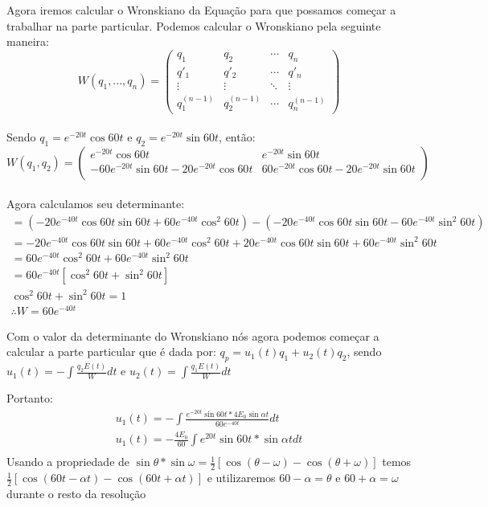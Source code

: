 \documentclass{abntex2}
\begin{document}
Agora iremos calcular o Wronskiano da Equação para que possamos começar a trabalhar na parte particular.
\vspace{0.5cm}
Podemos calcular o Wronskiano pela seguinte maneira:
$$ W(q_1, ..., q_n)=\left(\begin{array}{cccc}
q_{1} & q_{2} & \cdots & q_{n}\\
q'_{1} & q'_{2} & \cdots & q'_{n}\\
\vdots & \vdots & \ddots & \vdots\\
q^{(n-1)}_{1} & q^{(n-1)}_{2} & \cdots & q^{(n-1)}_{n}
\end{array}\right) $$
\\
\Large Sendo $q_1 = e^{-20t}\cos{60t}$ e $q_2 = e^{-20t}\sin{60t}$, então:\\
$$ W(q_1, q_2)=\left(\begin{array}{cccc}
e^{-20t}\cos{60t} & e^{-20t}\sin{60t}\\
-60e^{-20t}\sin{60t}-20e^{-20t}\cos{60t} & 60e^{-20t}\cos{60t}-20e^{-20t}\sin{60t}\\
\end{array}\right) $$
\\
\Large Agora calculamos seu determinante:
\begin{eqnarray*}
    =(-20e^{-40t}\cos{60t}\sin{60t} + 60e^{-40t}\cos^2{60t})-(-20e^{-40t}\cos{60t}\sin{60t}-60e^{-40t}\sin^2{60t})\\
    =-20e^{-40t}\cos{60t}\sin{60t} + 60e^{-40t}\cos^2{60t}+20e^{-40t}\cos{60t}\sin{60t}+60e^{-40t}\sin^2{60t}\\
    =60e^{-40t}\cos^2{60t} + 60e^{-40t}\sin^2{60t}\\
    =60e^{-40t}[\cos^2{60t} + \sin^2{60t}]\\
    \cos^2{60t} + \sin^2{60t} = 1\\
    \therefore W = 60e^{-40t}
\end{eqnarray*}

\newpage
\Large Com o valor da determinante do Wronskiano nós agora podemos começar a calcular a parte particular que é dada por: $q_p = u_1(t)q_1 + u_2(t)q_2$, sendo $u_1(t) = -{\int}\frac{q_2E(t)}{W}dt$ e $u_2(t) = {\int}\frac{q_1E(t)}{W}dt$\\

\vspace{0.1cm}

\Large {Portanto:}\\
\begin{eqnarray*}
    u_1(t) = -{\int}\frac{e^{-20t}\sin{60t}*4E_0\sin{{\alpha}t}}{60e^{-40t}}dt\\
    u_1(t) = -\frac{4E_0}{60}{\int}e^{20t}\sin{60t}*\sin{{\alpha}t}dt\\
\end{eqnarray*}
\Large Usando a propriedade de $\sin{\theta}*\sin{\omega} = \frac{1}{2}[\cos{(\theta - \omega)} - \cos{(\theta + \omega)}]$ temos $\frac{1}{2}[\cos{(60t - \alpha t)} - \cos{(60t + \alpha t)}]$ e utilizaremos $60 - \alpha = \theta$ e $60 + \alpha = \omega$ durante o resto da resolução\\
\end{document}
